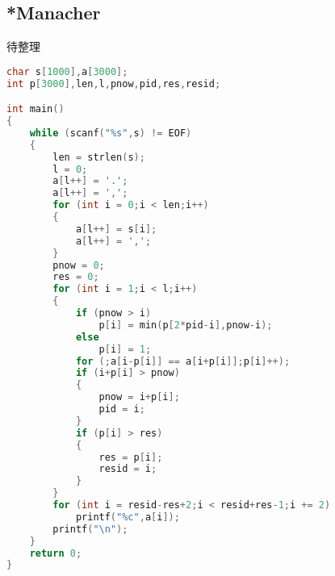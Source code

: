 \subsection{*Manacher}
    待整理
    \begin{lstlisting}[language=c++]
char s[1000],a[3000];
int p[3000],len,l,pnow,pid,res,resid;

int main()
{
    while (scanf("%s",s) != EOF)
    {
        len = strlen(s);
        l = 0;
        a[l++] = '.';
        a[l++] = ',';
        for (int i = 0;i < len;i++)
        {
            a[l++] = s[i];
            a[l++] = ',';
        }
        pnow = 0;
        res = 0;
        for (int i = 1;i < l;i++)
        {
            if (pnow > i)
                p[i] = min(p[2*pid-i],pnow-i);
            else
                p[i] = 1;
            for (;a[i-p[i]] == a[i+p[i]];p[i]++);
            if (i+p[i] > pnow)
            {
                pnow = i+p[i];
                pid = i;
            }
            if (p[i] > res)
            {
                res = p[i];
                resid = i;
            }
        }
        for (int i = resid-res+2;i < resid+res-1;i += 2)
            printf("%c",a[i]);
        printf("\n");
    }
    return 0;
}
    \end{lstlisting}
